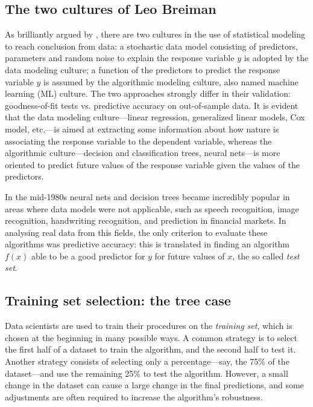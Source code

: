 \documentclass{statsoc}
\begin{document}
%

\color{black}

\subsection{The two cultures of Leo Breiman}

As brilliantly argued by \cite{breiman2001statistical}, there are two cultures in the use of statistical modeling to reach conclusion from data: a stochastic data model consisting 
of predictors, parameters and random noise to explain the response variable $y$ is adopted by the data modeling culture; a function of the predictors to predict the response variable 
$y$ is assumed by the algorithmic modeling culture, also named machine learning (ML) culture. The two approaches strongly differ in their validation: goodness-of-fit tests vs. 
predictive accuracy on out-of-sample data.  It is evident that the data modeling culture---linear regression, generalized linear models, Cox model, etc.---is aimed at extracting some information about how nature is associating the response variable to the dependent variable, whereas the algorithmic culture---decision and classification trees, neural nets---is more oriented to predict future values of the response variable given the values of the predictors.

In the mid-1980s neural nets and decision trees became incredibly popular \citep{breiman1984classification} in areas where data models were not applicable, such as 
speech recognition, image recognition, handwriting recognition, and prediction in financial markets. In analysing real data from this fields, the only criterion to evaluate these 
algorithms was predictive accuracy: this is translated in finding an algorithm $f(x)$ able to be a good predictor for $y$ for future values of $x$, the so called \emph{test set}. 

\subsection{Training set selection: the tree case}

Data scientists are used to train their procedures on the \emph{training set}, which is chosen at the beginning in many possible ways. A common strategy is to select the first half of a 
dataset to train the algorithm, and the second half to test it. Another strategy consists of selecting only a percentage---say, the 75\% of the dataset---and use the remaining 25\% to  test the algorithm. However, a small change in the dataset can cause a large change in the final predictions, and some adjustments are often required to increase the algorithm's robustness. 
\end{document}
